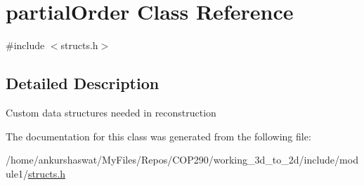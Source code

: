 \hypertarget{classpartialOrder}{}\section{partial\+Order Class Reference}
\label{classpartialOrder}


{\ttfamily \#include $<$structs.\+h$>$}



\subsection{Detailed Description}
Custom data structures needed in reconstruction 

The documentation for this class was generated from the following file\+:\begin{DoxyCompactItemize}
\item 
/home/ankurshaswat/\+My\+Files/\+Repos/\+C\+O\+P290/working\+\_\+3d\+\_\+to\+\_\+2d/include/module1/\hyperlink{structs_8h}{structs.\+h}\end{DoxyCompactItemize}
